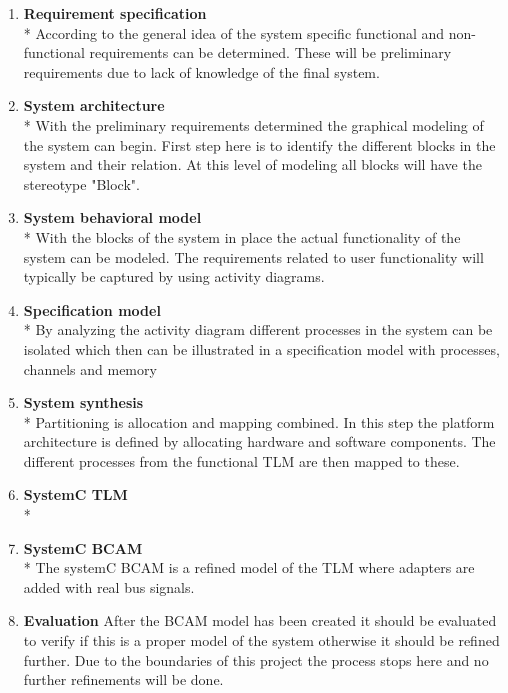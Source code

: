 \begin{enumerate}
		
  \item \textbf{Requirement specification}\\*
  		According to the general idea of the system specific functional and non-functional requirements can be determined. These will be preliminary requirements due to lack of knowledge of the final system. 
  \item \textbf{System architecture}\\*
  		With the preliminary requirements determined the graphical modeling of the system can begin. First step here is to identify the different blocks in the system and their relation. At this level of modeling all blocks will have the stereotype "Block".
  \item \textbf{System behavioral model}\\*
  		With the blocks of the system in place the actual functionality of the system can be modeled. The requirements related to user functionality will typically be captured by using activity diagrams.
  \item \textbf{Specification model}\\*
  		By analyzing the activity diagram different processes in the system can be isolated which then can be illustrated in a specification model with processes, channels and memory
  \item \textbf{System synthesis}\\*
  		Partitioning is allocation and mapping combined. In this step the platform architecture is defined by allocating hardware and software components. The different processes from the functional TLM are then mapped to these. 
  \item \textbf{SystemC TLM}\\*
  		
  \item \textbf{SystemC BCAM}\\*
  		The systemC BCAM is a refined model of the TLM where adapters are added with real bus signals. 
  \item \textbf{Evaluation}
  		After the BCAM model has been created it should be evaluated to verify if this is a proper model of the system otherwise it should be refined further. Due to the boundaries of this project the process stops here and no further refinements will be done.
\end{enumerate}

